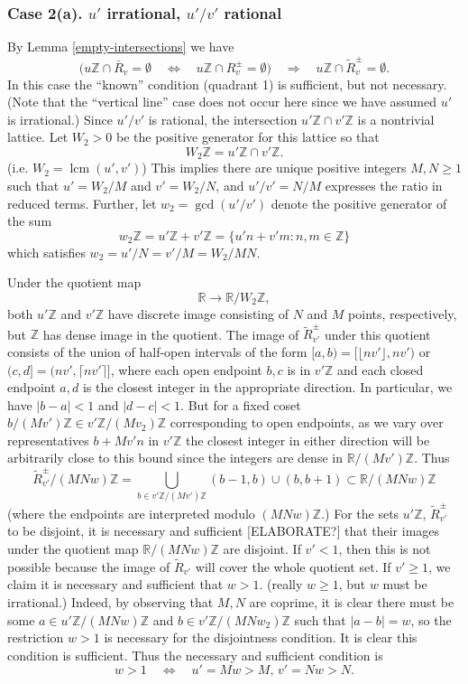 \documentclass[12pt,letterpaper, reqno]{amsart}
\theoremstyle{definition}
\theoremstyle{remark}
\newcommand{\RR}{\ensuremath{\mathbb{R}}}
\newcommand{\ZZ}{\ensuremath{\mathbb{Z}}}
\newcommand{\uu}{{u'}}
\newcommand{\vv}{{v'}}
\newcommand{\ww}{w}
\newcommand{\floor}[1]{\lfloor{#1}\rfloor}
\newcommand{\ceil}[1]{\lceil{#1}\rceil}
\DeclareMathOperator{\lcm}{lcm}
\begin{document}
\subsubsection{Case 2(a). $\uu$ irrational, $\uu/\vv$ rational}

By Lemma \ref{empty-intersections} we have
\[ \big( u\ZZ\cap \bar{R}_v = \emptyset \quad\Leftrightarrow\quad u\ZZ\cap R_v^\pm=\emptyset\big) \quad\Rightarrow\quad u\ZZ\cap \widetilde{R}_{v}^\pm =\emptyset.\]
In this case the ``known'' condition (quadrant 1) is sufficient, but not necessary. (Note that the ``vertical line'' case does not occur here since we have assumed $\uu$ is irrational.) Since $\uu/\vv$ is rational, the intersection $\uu\ZZ\cap \vv\ZZ$ is a nontrivial lattice. Let $W_2>0$ be the positive generator for this lattice so that
\[ W_2\ZZ = \uu\ZZ\cap \vv\ZZ .\]
(i.e. $W_2 = \lcm(\uu,\vv)$) This implies there are unique positive integers $M,N\geq 1$ such that $\uu = W_2/M$ and $\vv = W_2/N$, and $\uu/\vv = N/M$ expresses the ratio in reduced terms.
Further, let $w_2 = \gcd(\uu/\vv)$ denote the positive generator of the sum
\[ w_2\ZZ = \uu\ZZ + \vv\ZZ = \{ \uu n + \vv m : n,m\in \ZZ\} \]
which satisfies $w_2 = \uu/N = \vv/M = W_2/MN$.

Under the quotient map
\[ \RR \to \RR/W_2\ZZ,\]
both $\uu\ZZ$ and $\vv\ZZ$ have discrete image consisting of $N$ and $M$ points, respectively, but $\ZZ$ has dense image in the quotient. The image of $\widetilde{R}_{\vv}^\pm$ under this quotient consists of the union of half-open intervals of the form  $[a,b)=[ \floor{n\vv},n\vv)$ or $(c,d]=(n\vv, \ceil{n\vv}]$, where each open endpoint $b,c$ is in $\vv\ZZ$ and each closed endpoint $a,d$ is the closest integer in the appropriate direction. In particular, we have $|b-a|<1$ and $|d-c|<1$. 
But for a fixed coset $b/(M\vv)\ZZ \in \vv\ZZ/(Mv_2)\ZZ$ corresponding to open endpoints, as we vary over representatives $b+M\vv n$ in $\vv\ZZ$ the closest integer in either direction will be arbitrarily close to this bound since the integers are dense in $\RR/(M\vv)\ZZ$. 
Thus
\[ \widetilde{R}_{\vv}^\pm / (MN\ww)\ZZ = \bigcup_{b \in\vv\ZZ/(M\vv)\ZZ} (b-1,b)\cup(b,b+1) \subset \RR/(MN\ww)\ZZ\]
(where the endpoints are interpreted modulo $(MN\ww)\ZZ$.) 
For the sets $\uu\ZZ ,\, \widetilde{R}_{\vv}^\pm$ to be disjoint, it is necessary and sufficient [ELABORATE?] that their images under the quotient map $\RR/(MN\ww)\ZZ$ are disjoint. If $\vv<1$, then this is not possible because the image of $\widetilde{R}_\vv$ will cover the whole quotient set. If $\vv\geq 1$, we claim it is necessary and sufficient that $\ww>1$. (really $\ww\geq1$, but $\ww$ must be irrational.) Indeed, by observing that $M,N$ are coprime, it is clear there must be some $a\in \uu\ZZ/(MN\ww)\ZZ$ and $b\in \vv\ZZ/(MNw_2)\ZZ$ such that $|a-b| = \ww$, so the restriction $\ww>1$ is necessary for the disjointness condition. It is clear this condition is sufficient. Thus the necessary and sufficient condition is
\[ \ww>1 \quad\Leftrightarrow\quad \uu = M\ww > M,\, \vv = N\ww>N.\]
\end{document}
